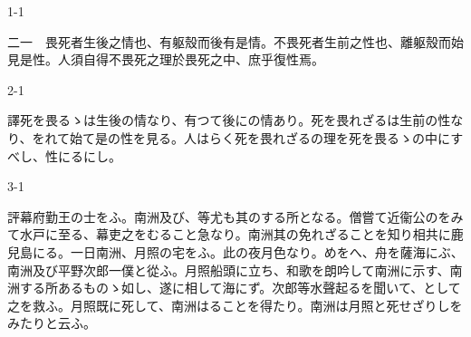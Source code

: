 \documentclass[tate,paper=b6j,jafontsize=9pt]{jlreq}
\begin{document}
\begin{azconvIndented}{1\zw}{-1\zw}

二一　畏死者生後之情也、有躯殼而後有是情。不畏死者生前之性也、離躯殼而始見是性。人須自得不畏死之理於畏死之中、庶乎復\azconvKunten{\azconvIR}性焉。

\end{azconvIndented}
\begin{azconvIndented}{2\zw}{-1\zw}

譯死を畏るゝは生後の情なり、有つて後にの情あり。死を畏れざるは生前の性なり、をれて始て是の性を見る。人はらく死を畏れざるの理を死を畏るゝの中にすべし、性にるにし。

\end{azconvIndented}
\begin{azconvIndented}{3\zw}{-1\zw}

評幕府勤王の士をふ。南洲及び、等尤も其のする所となる。僧嘗て近衞公のをみて水戸に至る、幕吏之をむること急なり。南洲其の免れざることを知り相共に鹿兒島にる。一日南洲、月照の宅をふ。此の夜月色なり。めをへ、舟を薩海にぶ、南洲及び平野次郎一僕と從ふ。月照船頭に立ち、和歌を朗吟して南洲に示す、南洲する所あるものゝ如し、遂に相して海にず。次郎等水聲起るを聞いて、として之を救ふ。月照既に死して、南洲はることを得たり。南洲は月照と死せざりしをみたりと云ふ。

\end{azconvIndented}
\end{document}
